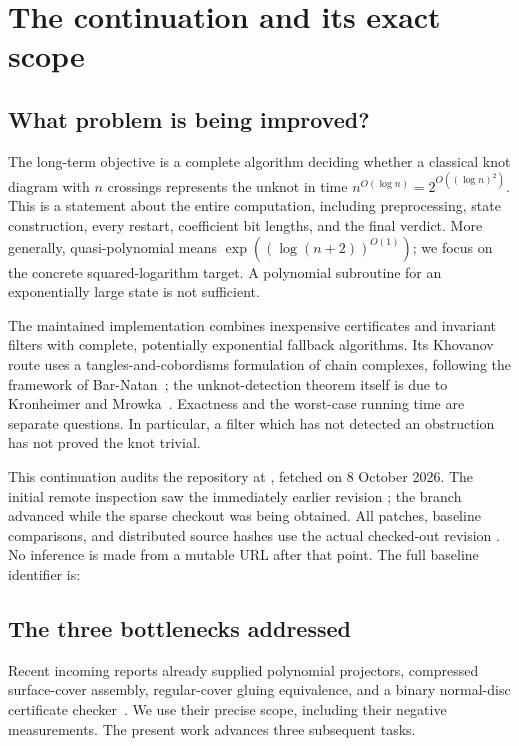 \section{The continuation and its exact scope}
\label{sec:scope}

\subsection{What problem is being improved?}

The long-term objective is a complete algorithm deciding whether a classical
knot diagram with $n$ crossings represents the unknot in time
$n^{O(\log n)}=2^{O((\log n)^2)}$. This is a statement about the entire
computation, including preprocessing, state construction, every restart,
coefficient bit lengths, and the final verdict. More generally,
quasi-polynomial means $\exp((\log(n+2))^{O(1)})$; we focus on the
concrete squared-logarithm target. A polynomial subroutine
for an exponentially large state is not sufficient.

The maintained implementation combines inexpensive certificates and
invariant filters with complete, potentially exponential fallback
algorithms. Its Khovanov route uses a tangles-and-cobordisms formulation
of chain complexes, following the framework of Bar-Natan~\cite{barnatan};
the unknot-detection theorem itself is due to Kronheimer and
Mrowka~\cite{km}. Exactness and the worst-case running time are separate
questions. In particular, a filter which has not detected an obstruction
has not proved the knot trivial.

This continuation audits the repository at \sourcepin, fetched on
8 October 2026. The initial remote inspection saw the immediately earlier
revision ; the branch advanced
while the sparse checkout was being obtained. All patches, baseline
comparisons, and distributed source hashes use the actual checked-out
revision \sourcepin. No inference is made from a mutable  URL
after that point. The full baseline identifier is:
\begin{center}
\end{center}

\subsection{The three bottlenecks addressed}

Recent incoming reports already supplied polynomial projectors, compressed
surface-cover assembly, regular-cover gluing equivalence, and a binary
normal-disc certificate checker~\cite{projectors,certificates}. We use
their precise scope, including their negative measurements. The present
work advances three subsequent tasks.

